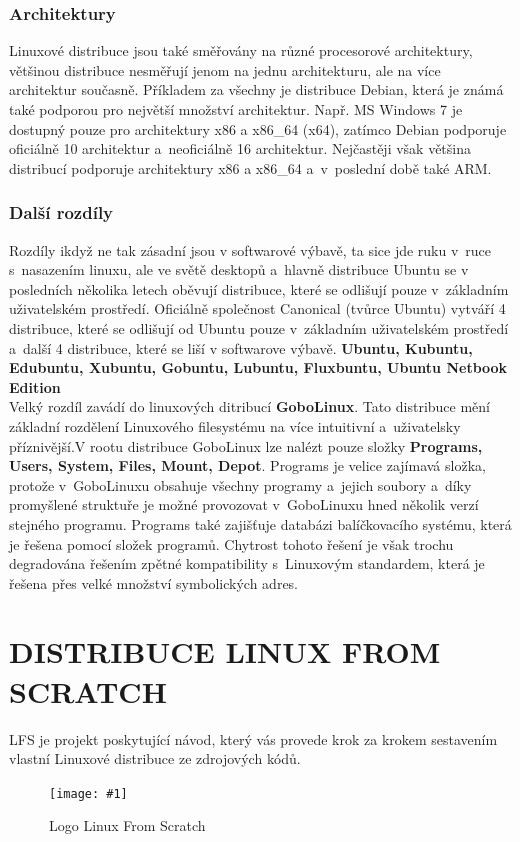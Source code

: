 \documentclass[a4paper,12pt]{article}
\newcommand{\upc}[1]{\uppercase{#1}} %
\newcommand{\obr}[3]{%
	\begin{figure}[h]
	\center\texttt{[image: \#1]}
	\caption{#3}
	\end{figure}
	}
\renewcommand{\b}[1]{\textbf{#1}} %
\begin{document}
\subsubsection{Architektury}
Linuxové distribuce jsou také směřovány na různé procesorové architektury, většinou distribuce nesměřují jenom na jednu architekturu, ale na více architektur současně. Příkladem za všechny je distribuce Debian, která je známá také podporou pro největší množství architektur. Např. MS Windows 7 je dostupný pouze pro architektury x86 a x86\_64 (x64), zatímco Debian podporuje oficiálně 10 architektur a~neoficiálně 16 architektur. Nejčastěji však většina distribucí podporuje architektury x86 a x86\_64 a~v~poslední době také ARM.

\subsubsection{Další rozdíly}
Rozdíly ikdyž ne tak zásadní jsou v softwarové výbavě, ta sice jde ruku v~ruce s~nasazením linuxu, ale ve světě desktopů a~hlavně distribuce Ubuntu se v posledních několika letech oběvují distribuce, které se odlišují pouze v~základním uživatelském prostředí. Oficiálně  společnost Canonical (tvůrce Ubuntu) vytváří 4 distribuce, které se odlišují od Ubuntu pouze v~základním uživatelském prostředí a~další 4 distribuce, které se liší v softwarove výbavě.
\b{Ubuntu, Kubuntu, Edubuntu, Xubuntu, Gobuntu, Lubuntu, Fluxbuntu, Ubuntu Netbook Edition}\\

Velký rozdíl zavádí do linuxových ditribucí \textbf{GoboLinux}. Tato distribuce mění základní rozdělení Linuxového filesystému na více intuitivní a~uživatelsky příznivější.V rootu distribuce GoboLinux lze nalézt pouze složky \b{Programs, Users, System, Files, Mount, Depot}. Programs je velice zajímavá složka, protože v~GoboLinuxu obsahuje všechny programy a~jejich soubory a~díky promyšlené struktuře je možné provozovat v~GoboLinuxu hned několik verzí stejného programu. Programs také zajišťuje databázi balíčkovacího systému, která je řešena pomocí složek programů. Chytrost tohoto řešení je však trochu degradována řešením zpětné kompatibility s~Linuxovým standardem, která je řešena přes velké množství symbolických adres.~\cite{GoboLinuxFilesystem}~\cite{GoboLinuxMain}

\section{\upc{Distribuce Linux from scratch}}
LFS je projekt poskytující návod, který vás provede krok za krokem sestavením vlastní Linuxové distribuce ze zdrojových kódů.~\cite{LFSwMAIN}
\obr{./img/lfs-logo.png}{1}{Logo Linux From Scratch}
\end{document}
